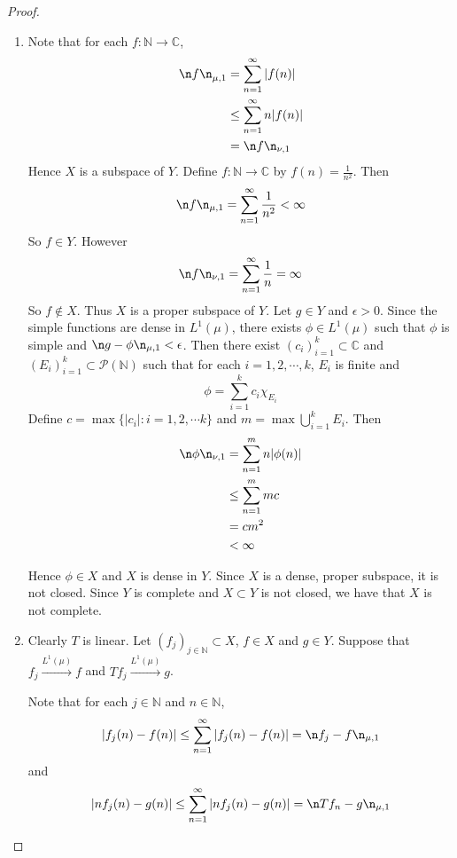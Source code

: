 \documentclass[12pt]{amsart}
\newcommand{\ep}{\epsilon}
\newcommand{\C}{\mathbb{C}}
\newcommand{\N}{\mathbb{N}}
\newcommand{\MP}{\mathcal{P}}
\newcommand{\conv}[1]{\xrightarrow{#1}}
\begin{document}
\begin{proof}
	\begin{enumerate}
		\item Note that for each $f: \N \rightarrow \C$, 
		\begin{align*}
			{\n f \n}_{\mu, 1}
			&= \sum_{n=1}^{\infty} \vert f(n) \vert  \\
			& \leq \sum_{n=1}^{\infty} n \vert f(n) \vert  \\
			& = \n f \n_{\nu,1} 
		\end{align*} 
		Hence $X$ is a subspace of $Y$. Define $f : \N \rightarrow \C$ by $f(n) = \frac{1}{n^2}$. Then $$\n f \n_{\mu, 1} = \sum_{n=1}^{\infty} \frac{1}{n^2} < \infty$$ So  $f \in Y$. However $$\n f \n_{\nu, 1} = \sum_{n=1}^\infty \frac{1}{n} = \infty$$ So $f \not \in X$. Thus $X$ is a proper subspace of $Y$. Let $g \in Y$ and $\ep >0$. Since the simple functions are dense in $L^1(\mu)$, there exists $\phi \in L^1(\mu)$ such that $\phi$ is simple and $\n g - \phi \n_{\mu ,1} < \ep$. Then there exist $(c_i)_{i=1}^k \subset \C$ and $ (E_i)_{i=1}^k \subset \MP(\N)$ such that for each $i =1,2,\cdots, k$, $E_i$ is finite and  $$\phi = \sum_{i=1}^kc_i \chi_{E_i}$$ Define $c = \max\{\vert c_i \vert: i=1,2,\cdots k\}$ and $m = \max \bigcup_{i=1}^k E_i$. Then 
		\begin{align*}
			\n \phi \n_{\nu,1} 
			&=  \sum_{n=1}^m n \vert \phi(n) \vert \\
			& \leq \sum_{n=1}^m  mc \\
			& = c m^2 \\
			& < \infty
		\end{align*}
		
		Hence $\phi \in X$ and $X$ is dense in $Y$. Since $X$ is a dense, proper subspace, it is not closed. Since $Y$ is complete and $X \subset Y$ is not closed, we have that $X$ is not complete.
		\item Clearly $T$ is linear. Let $(f_j)_{j \in \N} \subset X$, $f \in X$ and $g \in Y$. Suppose that $f_j \conv{L^1(\mu)} f$ and $Tf_j \conv{L^1(\mu)} g$. 
		
		Note that for each $j \in \N$ and $n \in \N$, $$\vert f_j(n) - f(n) \vert \leq \sum_{n =1}^{\infty}\vert f_j(n) - f(n) \vert = \n f_j-f \n_{\mu, 1}$$ and $$\vert nf_j(n) - g(n) \vert \leq \sum_{n =1}^{\infty}\vert nf_j(n) - g(n) \vert = \n Tf_n - g\n_{\mu, 1}$$  
		

\end{enumerate}
\end{proof}
\end{document}
